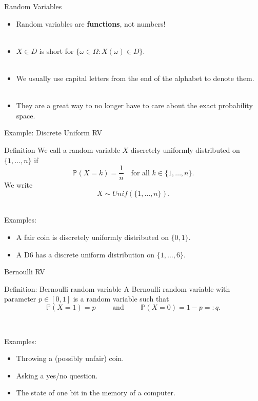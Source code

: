 \documentclass[11pt,pdf,ngerman,UKenglish]{beamer}%
\newcommand{\IP}{\mathbb{P}}
\newcommand{\1}{\mathbb{1}}
\theoremstyle{thm}
\theoremstyle{def}
\begin{document}
\begin{frame}{Random Variables}
\begin{itemize}
\item Random variables are \textbf{functions}, not numbers!
\\ \
\item $X \in D$ is short for $\{ \omega \in \Omega: X(\omega) \in D \}$.
\\ \
\item We usually use capital letters from the end of the alphabet to denote them.
\\ \
\item They are a great way to no longer have to care about the exact probability space.
\end{itemize}
\end{frame}


\begin{frame}{Example: Discrete Uniform RV}
\begin{block}{Definition}
We call a random variable $X$ discretely uniformly distributed on $\{ 1, \ldots, n \}$ if
$$ \IP( X =k) = \frac1n \quad \text{for all } k \in \{1,\ldots, n \}.$$
We write
$$X \sim Unif(\{1,\ldots, n\}).$$
\end{block}

\ \\
Examples:
\begin{itemize}
\item A fair coin is discretely uniformly distributed on $\{ 0, 1 \}$.
\item A D6 has a discrete uniform distribution on $\{ 1, \ldots, 6 \}$.
\end{itemize}
\end{frame}


\begin{frame}{Bernoulli RV}
\begin{block}{Definition: Bernoulli random variable}
A Bernoulli random variable with parameter $p \in [0,1]$ is a random variable such that
$$ \IP(X=1)=p \qquad \text{ and } \qquad \IP(X=0)=1-p=:q. $$
\end{block}
\

Examples:
\begin{itemize}
\item Throwing a (possibly unfair) coin.
\item Asking a yes/no question.
\item The state of one bit in the memory of a computer.
\end{itemize}
\end{frame}
\end{document}

